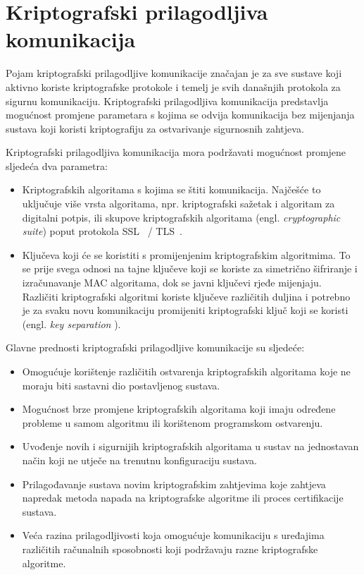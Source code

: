 \chapter{Kriptografski prilagodljiva komunikacija}
\label{ch:agility}

Pojam kriptografski prilagodljive komunikacije značajan je za sve sustave koji
aktivno koriste kriptografske protokole i temelj je svih današnjih
protokola za sigurnu komunikaciju. Kriptografski prilagodljiva komunikacija
predstavlja mogućnost promjene parametara s kojima se odvija komunikacija
bez mijenjanja sustava koji koristi kriptografiju za ostvarivanje sigurnosnih
zahtjeva.

Kriptografski prilagodljiva komunikacija mora podržavati mogućnost promjene
sljedeća dva parametra:
\begin{itemize}
    \item Kriptografskih algoritama s kojima se štiti
	komunikacija. Najčešće to uključuje više vrsta algoritama, npr.
	kriptografski sažetak i algoritam za digitalni potpis, ili skupove
	kriptografskih algoritama (engl. \emph{cryptographic suite}) poput
	protokola SSL~\cite{rfc6101} / TLS~\cite{rfc5246}.
    \item Ključeva koji će se koristiti s promijenjenim kriptografskim
	algoritmima. To se prije svega odnosi na tajne ključeve koji se koriste
	za simetrično šifriranje i izračunavanje MAC algoritama, dok se javni
	ključevi rjeđe mijenjaju. Različiti kriptografski algoritmi koriste
	ključeve različitih duljina i potrebno je za svaku novu komunikaciju
	promijeniti kriptografski ključ koji se koristi (engl. \emph{key
	separation} \cite{krawczyk1996skeme}).
\end{itemize}
Glavne prednosti kriptografski prilagodljive komunikacije su sljedeće:
\begin{itemize}
    \item Omogućuje korištenje različitih ostvarenja kriptografskih
	algoritama koje ne moraju biti sastavni dio postavljenog sustava.
    \item Mogućnost brze promjene kriptografskih algoritama koji imaju određene
	probleme u samom algoritmu ili korištenom programskom ostvarenju.
    \item Uvođenje novih i sigurnijih kriptografskih algoritama u sustav na
	jednostavan način koji ne utječe na trenutnu konfiguraciju sustava.
    \item Prilagođavanje sustava novim kriptografskim zahtjevima koje zahtjeva
	napredak metoda napada na kriptografske algoritme ili proces
	certifikacije sustava.
    \item Veća razina prilagodljivosti koja omogućuje komunikaciju s uređajima
	različitih računalnih sposobnosti koji podržavaju razne kriptografske
	algoritme. 
\end{itemize}


